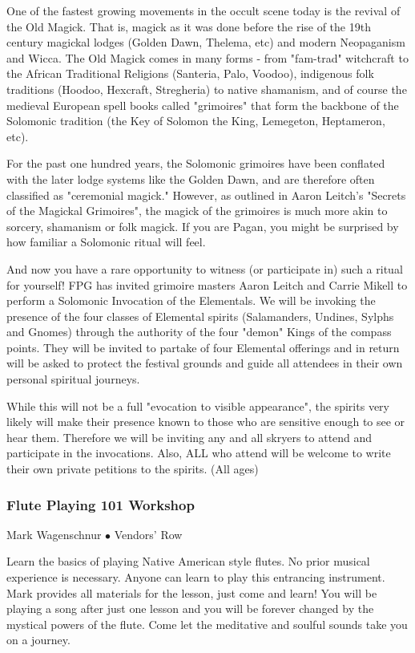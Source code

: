  One of the fastest growing movements in the occult scene today is the revival of the Old Magick.  That is, magick as it was done before the rise of the 19th century magickal lodges (Golden Dawn, Thelema, etc) and modern Neopaganism and Wicca.  The Old Magick comes in many forms - from "fam-trad" witchcraft to the African Traditional Religions (Santeria, Palo, Voodoo), indigenous folk traditions (Hoodoo, Hexcraft, Stregheria) to native shamanism, and of course the medieval European spell books called "grimoires" that form the backbone of the Solomonic tradition (the Key of Solomon the King, Lemegeton, Heptameron, etc).

For the past one hundred years, the Solomonic grimoires have been conflated with the later lodge systems like the Golden Dawn, and are therefore often classified as "ceremonial magick."  However, as outlined in Aaron Leitch's "Secrets of the Magickal Grimoires", the magick of the grimoires is much more akin to sorcery, shamanism or folk magick.  If you are Pagan, you might be surprised by how familiar a Solomonic ritual will feel.

And now you have a rare opportunity to witness (or participate in) such a ritual for yourself!  FPG has invited grimoire masters Aaron Leitch and Carrie Mikell to perform a Solomonic Invocation of the Elementals.  We will be invoking the presence of the four classes of Elemental spirits (Salamanders, Undines, Sylphs and Gnomes) through the authority of the four "demon" Kings of the compass points.  They will be invited to partake of four Elemental offerings and in return will be asked to protect the festival grounds and guide all attendees in their own personal spiritual journeys.

While this will not be a full "evocation to visible appearance", the spirits very likely will make their presence known to those who are sensitive enough to see or hear them.  Therefore we will be inviting any and all skryers to attend and participate in the invocations.  Also, ALL who attend will be welcome to write their own private petitions to the spirits. {\small (All ages)}

\subsubsection{Flute Playing 101 Workshop}
\label{Thu-Mark1}
{\small Mark Wagenschnur $\bullet$  Vendors' Row}

 Learn the basics of playing Native American style flutes.  No prior musical experience is necessary.  Anyone can learn to play this entrancing instrument.  Mark provides all materials for the lesson, just come and learn!   You will be playing a song after just one lesson and you will be forever changed by the mystical powers of the flute.  Come let the meditative and soulful sounds take you on a journey.

